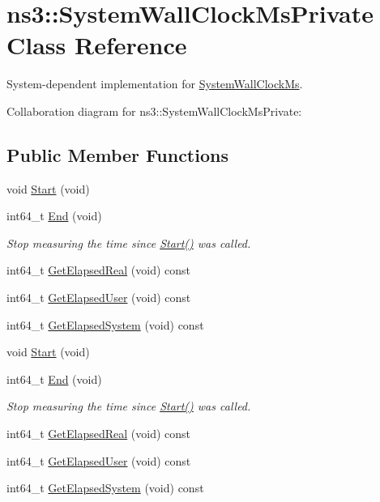 \hypertarget{classns3_1_1SystemWallClockMsPrivate}{}\section{ns3\+:\+:System\+Wall\+Clock\+Ms\+Private Class Reference}
\label{classns3_1_1SystemWallClockMsPrivate}


System-\/dependent implementation for \hyperlink{classns3_1_1SystemWallClockMs}{System\+Wall\+Clock\+Ms}.  




Collaboration diagram for ns3\+:\+:System\+Wall\+Clock\+Ms\+Private\+:
\subsection*{Public Member Functions}
\begin{DoxyCompactItemize}
\item 
void \hyperlink{classns3_1_1SystemWallClockMsPrivate_a5e727e39048fa7bea68a9b172f06f71d}{Start} (void)
\item 
int64\+\_\+t \hyperlink{classns3_1_1SystemWallClockMsPrivate_af9060c5b2f9bd7c05916958fee24c783}{End} (void)
\begin{DoxyCompactList}\small\item\em Stop measuring the time since \hyperlink{classns3_1_1SystemWallClockMsPrivate_a5e727e39048fa7bea68a9b172f06f71d}{Start()} was called. \end{DoxyCompactList}\item 
int64\+\_\+t \hyperlink{classns3_1_1SystemWallClockMsPrivate_a4e6f5922cbceb522e762d41714ee1596}{Get\+Elapsed\+Real} (void) const 
\item 
int64\+\_\+t \hyperlink{classns3_1_1SystemWallClockMsPrivate_ad993444d1a5f9ba2d470a213522bf74d}{Get\+Elapsed\+User} (void) const 
\item 
int64\+\_\+t \hyperlink{classns3_1_1SystemWallClockMsPrivate_a97955fa27a609691d48576107d6d7705}{Get\+Elapsed\+System} (void) const 
\item 
void \hyperlink{classns3_1_1SystemWallClockMsPrivate_a5e727e39048fa7bea68a9b172f06f71d}{Start} (void)
\item 
int64\+\_\+t \hyperlink{classns3_1_1SystemWallClockMsPrivate_af9060c5b2f9bd7c05916958fee24c783}{End} (void)
\begin{DoxyCompactList}\small\item\em Stop measuring the time since \hyperlink{classns3_1_1SystemWallClockMsPrivate_a5e727e39048fa7bea68a9b172f06f71d}{Start()} was called. \end{DoxyCompactList}\item 
int64\+\_\+t \hyperlink{classns3_1_1SystemWallClockMsPrivate_a4e6f5922cbceb522e762d41714ee1596}{Get\+Elapsed\+Real} (void) const 
\item 
int64\+\_\+t \hyperlink{classns3_1_1SystemWallClockMsPrivate_ad993444d1a5f9ba2d470a213522bf74d}{Get\+Elapsed\+User} (void) const 
\item 
int64\+\_\+t \hyperlink{classns3_1_1SystemWallClockMsPrivate_a97955fa27a609691d48576107d6d7705}{Get\+Elapsed\+System} (void) const 
\end{DoxyCompactItemize}
